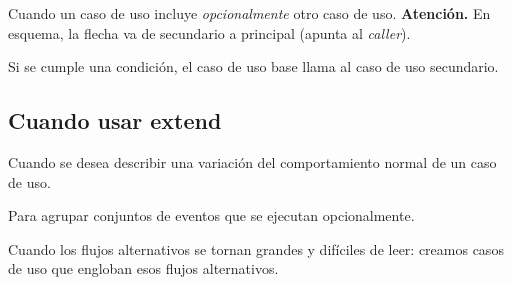 Cuando un caso de uso incluye \textit{opcionalmente} otro caso de uso. 
\textbf{Atención.} En esquema, la flecha va de secundario a principal (apunta al \textit{caller}).

Si se cumple una condición, el caso de uso base llama al caso de uso secundario.

\subsection{Cuando usar extend}

Cuando se desea describir una variación del comportamiento normal de un caso de uso.

Para agrupar conjuntos de eventos que se ejecutan opcionalmente.

Cuando los flujos alternativos se tornan grandes y difíciles de leer: 
creamos casos de uso que engloban esos flujos alternativos.
